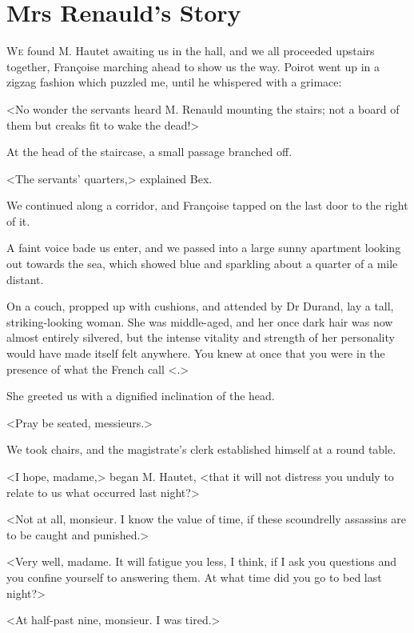 \chapter{Mrs Renauld's Story}
	
\lettrine{W}{e} found M. Hautet awaiting us in the hall, and we all proceeded upstairs together, Françoise marching ahead to show us the way. Poirot went up in a zigzag fashion which puzzled me, until he whispered with a grimace: 

 <No wonder the servants heard M. Renauld mounting the stairs; not a board of them but creaks fit to wake the dead!> 

 At the head of the staircase, a small passage branched off. 

 <The servants' quarters,> explained Bex. 

 We continued along a corridor, and Françoise tapped on the last door to the right of it. 

 A faint voice bade us enter, and we passed into a large sunny apartment looking out towards the sea, which showed blue and sparkling about a quarter of a mile distant. 

 On a couch, propped up with cushions, and attended by Dr Durand, lay a tall, striking-looking woman. She was middle-aged, and her once dark hair was now almost entirely silvered, but the intense vitality and strength of her personality would have made itself felt anywhere. You knew at once that you were in the presence of what the French call <.> 

 She greeted us with a dignified inclination of the head. 

 <Pray be seated, messieurs.> 
 


 We took chairs, and the magistrate's clerk established himself at a round table. 

 <I hope, madame,> began M. Hautet, <that it will not distress you unduly to relate to us what occurred last night?> 

 <Not at all, monsieur. I know the value of time, if these scoundrelly assassins are to be caught and punished.> 

 <Very well, madame. It will fatigue you less, I think, if I ask you questions and you confine yourself to answering them. At what time did you go to bed last night?> 

 <At half-past nine, monsieur. I was tired.> 

